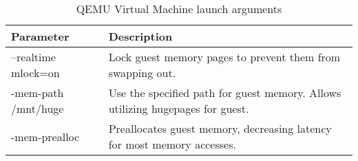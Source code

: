 \begin{table}
    \centering
    \caption{QEMU Virtual Machine launch arguments}
    \label{tab:qemu_params_table}
\begin{tabular}{|l|p{10cm}|}
\hline
Parameter & Description \\
\hline \hline
--realtime mlock=on & Lock guest memory pages to prevent them from swapping out.\\ 
\hline
-mem-path /mnt/huge & Use the specified path for guest memory.  Allows utilizing hugepages for guest.\\
\hline
-mem-prealloc & Preallocates guest memory, decreasing latency for most memory accesses.\\
\hline
\end{tabular}
\end{table}
